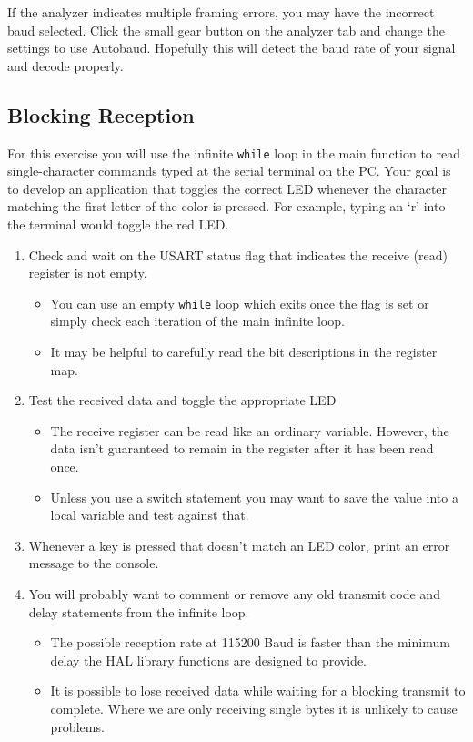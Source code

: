 \documentclass[openany,11pt,fleqn]{book} %
\begin{document}
If the analyzer indicates multiple framing errors, you may have the incorrect baud selected. Click the small gear button on the analyzer tab and change the settings to use Autobaud. Hopefully this will detect the baud rate of your signal and decode properly. 



\subsection{Blocking Reception}

For this exercise you will use the infinite \texttt{while} loop in the main function to read single-character commands typed at the serial terminal on the PC. Your goal is to develop an application that toggles the correct LED whenever the character matching the first letter of the color is pressed. For example, typing an `r' into the terminal would toggle the red LED. 

\begin{exercise}
	\begin{enumerate}
	    \item Check and wait on the USART status flag that indicates the receive (read) register is not empty.
	    \begin{itemize}
	        \item You can use an empty \texttt{while} loop which exits once the flag is set or simply check each iteration of the main infinite loop. 
	        \item It may be helpful to carefully read the bit descriptions in the register map.
	    \end{itemize}
	    \item Test the received data and toggle the appropriate LED
	    \begin{itemize}
	        \item The receive register can be read like an ordinary variable. However, the data isn't guaranteed to remain in the register after it has been read once. 
	        \item Unless you use a switch statement you may want to save the value into a local variable and test against that. 
	    \end{itemize}
	    \item Whenever a key is pressed that doesn't match an LED color, print an error message to the console. 
	    \item You will probably want to comment or remove any old transmit code and delay statements from the infinite loop. 
	    \begin{itemize}
	        \item The possible reception rate at 115200 Baud is faster than the minimum delay the HAL library functions are designed to provide. 
	        \item It is possible to lose received data while waiting for a blocking transmit to complete. Where we are only receiving single bytes it is unlikely to cause problems.
	    \end{itemize}
	\end{enumerate}
\end{exercise}
\end{document}
